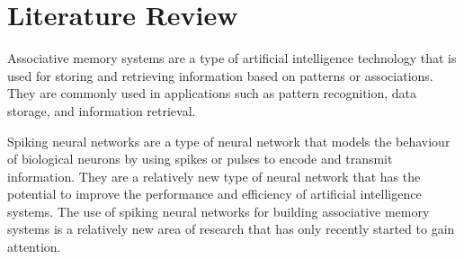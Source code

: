 \chapter{Literature Review}

Associative memory systems are a type of artificial intelligence technology
that is used for storing and retrieving information based on patterns or
associations. They are commonly used in applications such as pattern
recognition, data storage, and information retrieval.

Spiking neural networks are a type of neural network that models the behaviour
of biological neurons by using spikes or pulses to encode and transmit
information. They are a relatively new type of neural network that has the
potential to improve the performance and efficiency of artificial intelligence
systems. The use of spiking neural networks for building associative memory
systems is a relatively new area of research that has only recently started to
gain attention.






